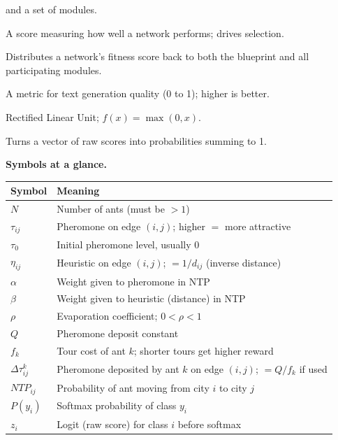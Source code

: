 \documentclass[a4paper,11pt]{article}
\begin{document}
\begin{description}[leftmargin=9em,style=nextline,font=\normalfont\bfseries\color{navy}]
    and a set of modules.
  \item[fitness] A score measuring how well a network performs; drives
    selection.
  \item[shared fitness] Distributes a network's fitness score back to
    both the blueprint and all participating modules.
  \item[BLEU score] A metric for text generation quality (0 to 1);
    higher is better.
  \item[ReLU] Rectified Linear Unit; $f(x) = \max(0, x)$.
  \item[softmax] Turns a vector of raw scores into probabilities summing
    to 1.
\end{description}

\medskip
\noindent\textbf{Symbols at a glance.}
\begin{center}\small
\begin{tabular}{@{}p{2.8cm}p{9.5cm}@{}}
\toprule
\textbf{Symbol} & \textbf{Meaning} \\
\midrule
$N$              & Number of ants (must be $> 1$) \\
$\tau_{ij}$      & Pheromone on edge $(i,j)$; higher $=$ more attractive \\
$\tau_0$         & Initial pheromone level, usually 0 \\
$\eta_{ij}$      & Heuristic on edge $(i,j)$; $= 1/d_{ij}$ (inverse distance) \\
$\alpha$         & Weight given to pheromone in NTP \\
$\beta$          & Weight given to heuristic (distance) in NTP \\
$\rho$           & Evaporation coefficient; $0 < \rho < 1$ \\
$Q$              & Pheromone deposit constant \\
$f_k$            & Tour cost of ant $k$; shorter tours get higher reward \\
$\Delta\tau_{ij}^k$ & Pheromone deposited by ant $k$ on edge $(i,j)$; $= Q/f_k$ if used \\
$NTP_{ij}$       & Probability of ant moving from city $i$ to city $j$ \\
$P(y_i)$         & Softmax probability of class $y_i$ \\
$z_i$            & Logit (raw score) for class $i$ before softmax \\
\bottomrule
\end{tabular}
\end{center}
\end{document}

